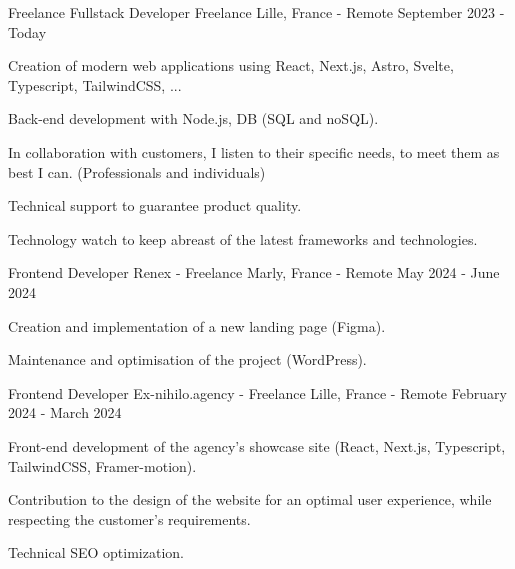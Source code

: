 
\begin{cventries}
  \cventry
    {Freelance Fullstack Developer} %
    {Freelance} %
    {Lille, France - Remote} %
    {September 2023 - Today} %
    {
      \begin{cvitems} %
        \item {Creation of modern web applications using React, Next.js, Astro, Svelte, Typescript, TailwindCSS, ...}
        \item {Back-end development with Node.js, DB (SQL and noSQL).}
        \item {In collaboration with customers, I listen to their specific needs, to meet them as best I can. (Professionals and individuals)}
        \item {Technical support to guarantee product quality.}
        \item {Technology watch to keep abreast of the latest frameworks and technologies.}
      \end{cvitems}
    }

  \cventry
    {Frontend Developer} %
    {Renex - Freelance} %
    {Marly, France - Remote} %
    {May 2024 - June 2024} %
    {
      \begin{cvitems} %
        \item {Creation and implementation of a new landing page (Figma).}
        \item {Maintenance and optimisation of the project (WordPress).}
      \end{cvitems}
    }  

  \cventry
    {Frontend Developer} %
    {Ex-nihilo.agency - Freelance} %
    {Lille, France - Remote} %
    {February 2024 - March 2024} %
    {
      \begin{cvitems} %
        \item {Front-end development of the agency's showcase site (React, Next.js, Typescript, TailwindCSS, Framer-motion).}
        \item {Contribution to the design of the website for an optimal user experience, while respecting the customer's requirements.}
        \item {Technical SEO optimization.}
      \end{cvitems}
    }


\end{cventries}
